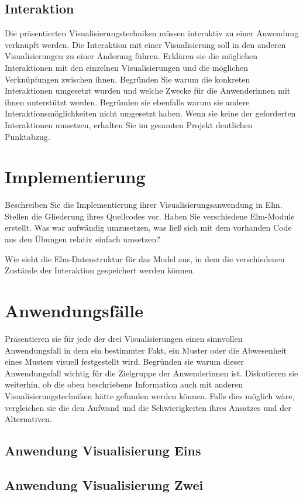 \documentclass[usegeometry=true]{scrartcl}
\begin{document}
\subsection{Interaktion}
Die präsentierten Visualisierungstechniken müssen interaktiv zu einer Anwendung verknüpft werden.
Die Interaktion mit einer Visualisierung soll in den anderen Visualisierungen zu einer Änderung führen. 
Erklären sie die möglichen Interaktionen mit den einzelnen Visualisierungen und die möglichen Verknüpfungen zwischen ihnen. Begründen Sie warum die konkreten Interaktionen umgesetzt wurden und welche Zwecke für die Anwenderinnen mit ihnen unterstützt werden. Begründen sie ebenfalls warum sie andere Interaktionsmöglichkeiten nicht umgesetzt haben. Wenn sie keine der geforderten Interaktionen umsetzen, erhalten Sie im gesamten Projekt deutlichen Punktabzug. 

\section{Implementierung}
Beschreiben Sie die Implementierung ihrer Visualisierungsanwendung in Elm. Stellen die Gliederung ihres Quellcodes vor. Haben Sie verschiedene Elm-Module erstellt. Was war aufwändig umzusetzen, was ließ sich mit dem vorhanden Code aus den Übungen relativ einfach umsetzen? 

Wie sieht die Elm-Datenstruktur für das Model aus, in dem die verschiedenen Zustände der Interaktion gespeichert werden können.

\section{Anwendungsfälle}
Präsentieren sie für jede der drei Visualisierungen einen sinnvollen Anwendungsfall in dem ein bestimmter Fakt, ein Muster oder die Abwesenheit eines Musters visuell festgestellt wird. Begründen sie warum dieser Anwendungsfall wichtig für die Zielgruppe der Anwenderinnen ist. Diskutieren sie weiterhin, ob die oben beschriebene Information auch mit anderen Visualisierungstechniken hätte gefunden werden können. Falls dies möglich wäre, vergleichen sie die den Aufwand und die Schwierigkeiten ihres Ansatzes und der Alternativen. 
\subsection{Anwendung Visualisierung Eins}
\subsection{Anwendung Visualisierung Zwei}
\end{document}
